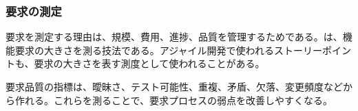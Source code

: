 \subsubsection{要求の測定}

要求を測定する理由は、規模、費用、進捗、品質を管理するためである。は、機能要求の大きさを測る技法である。アジャイル開発で使われるストーリーポイントも、要求の大きさを表す測度として使われることがある。

要求品質の指標は、曖昧さ、テスト可能性、重複、矛盾、欠落、変更頻度などから作れる。これらを測ることで、要求プロセスの弱点を改善しやすくなる。
